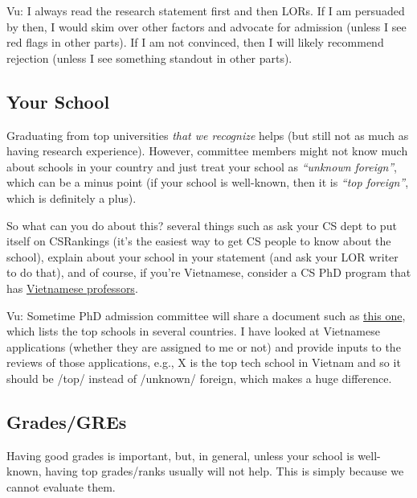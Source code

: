 \documentclass[10pt]{article}
\begin{document}
\begin{tcolorbox}[left=1pt,right=1pt,top=1pt,bottom=1pt]
Vu: I always read the research statement first and then LORs. If I am
persuaded by then, I would skim over other factors and advocate for
admission (unless I see red flags in other parts). If I am not
convinced, then I will likely recommend rejection (unless I see
something standout in other parts).
\end{tcolorbox}


\subsection{Your School}\label{sec:your-school}

Graduating from top universities \emph{that we recognize} helps (but still not as much as having research experience).
However, committee members might not know much about schools in your country and just treat your school as
\emph{``unknown foreign''}, which can be a minus point (if your school is well-known, then it is \emph{``top foreign''}, which is definitely a plus).

So what can you do about this? several things such as ask your CS dept to put itself on CSRankings (it's the easiest way to get CS people to know about the school), explain about your school in your statement (and ask your LOR writer to do that), and of course, if you're Vietnamese, consider a CS PhD program that has \href{https://github.com/dynaroars/dynaroars.github.io/wiki/Viet-CS-Profs-US}{Vietnamese professors}.

\begin{tcolorbox}[left=1pt,right=1pt,top=1pt,bottom=1pt]
Vu: Sometime PhD admission committee will share a document such as \href{https://github.com/dynaroars/dynaroars.github.io/wiki/Foreign-Top-Schools}{this one}, which lists the top schools in several countries. I have looked at Vietnamese applications (whether they are assigned to me or not) and provide inputs to the reviews of those applications, e.g., X is the top tech school in Vietnam and so it should be /top/ instead of /unknown/ foreign, which makes a huge difference.
\end{tcolorbox}

\subsection{Grades/GREs}\label{sec:grades}
Having good grades is important, but, in general, unless your school is well-known, having top grades/ranks
usually will not help. This is simply because we cannot evaluate them.
\end{document}
